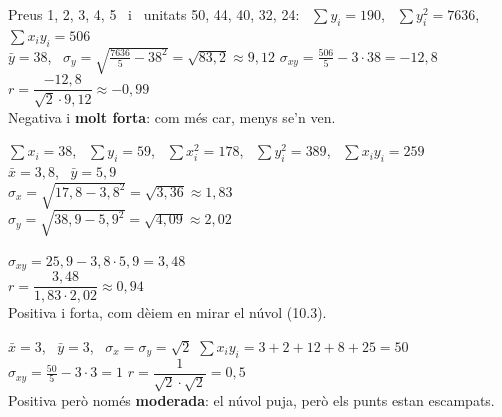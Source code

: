 \documentclass[11pt,a4paper]{article}
\newcommand{\nuvol}[4]{\draw[fmmuted!25] (0,0) grid (#1,#2);
  \draw[-{Latex[length=2mm]},fmmuted,line width=0.8pt] (0,0) -- (#1+0.6,0) node[right,font=\scriptsize] {#3};
  \draw[-{Latex[length=2mm]},fmmuted,line width=0.8pt] (0,0) -- (0,#2+0.6) node[above,font=\scriptsize] {#4};}
\newcommand{\pnt}[1]{\fill[fmblue] #1 circle (3pt);}
\begin{document}
\vfill
\begin{exemple}
Preus 1, 2, 3, 4, 5 \ i \ unitats 50, 44, 40, 32, 24: \ $\sum y_i=190$, \ $\sum y_i^2=7636$, \ $\sum x_iy_i=506$\\[4pt]
$\bar y=38$, \ $\sigma_y=\sqrt{\frac{7636}5-38^2}=\sqrt{83{,}2}\approx9{,}12$ \qquad $\sigma_{xy}=\frac{506}5-3\cdot38=-12{,}8$ \qquad $r=\dfrac{-12{,}8}{\sqrt2\cdot9{,}12}\approx\boxed{-0{,}99}$\\[3pt]
Negativa i \textbf{molt forta}: com més car, menys se'n ven.
\end{exemple}

\vfill
\begin{exemple}
\begin{minipage}[c]{0.5\linewidth}
$\sum x_i=38$, \ $\sum y_i=59$, \ $\sum x_i^2=178$, \ $\sum y_i^2=389$, \ $\sum x_iy_i=259$\\[4pt]
$\bar x=3{,}8$, \ $\bar y=5{,}9$\\[3pt]
$\sigma_x=\sqrt{17{,}8-3{,}8^2}=\sqrt{3{,}36}\approx1{,}83$\\[3pt]
$\sigma_y=\sqrt{38{,}9-5{,}9^2}=\sqrt{4{,}09}\approx2{,}02$
\end{minipage}\hfill
\begin{minipage}[c]{0.47\linewidth}
$\sigma_{xy}=25{,}9-3{,}8\cdot5{,}9=3{,}48$\\[4pt]
$r=\dfrac{3{,}48}{1{,}83\cdot2{,}02}\approx\boxed{0{,}94}$\\[4pt]
Positiva i forta, com dèiem en mirar el núvol (10.3).
\end{minipage}
\end{exemple}

\vfill
\begin{exemple}[Exemple: \ $x_i$: 1, 2, 3, 4, 5 \ i \ $y_i$: 3, 1, 4, 2, 5]
\begin{minipage}[c]{0.3\linewidth}\centering
{}
\end{minipage}\hfill
\begin{minipage}[c]{0.67\linewidth}
$\bar x=3$, \ $\bar y=3$, \ $\sigma_x=\sigma_y=\sqrt2$ \qquad $\sum x_iy_i=3+2+12+8+25=50$\\[4pt]
$\sigma_{xy}=\frac{50}5-3\cdot3=1$ \qquad $r=\dfrac{1}{\sqrt2\cdot\sqrt2}=\boxed{0{,}5}$\\[4pt]
Positiva però només \textbf{moderada}: el núvol puja, però els punts estan escampats.
\end{minipage}
\end{exemple}
\end{document}

